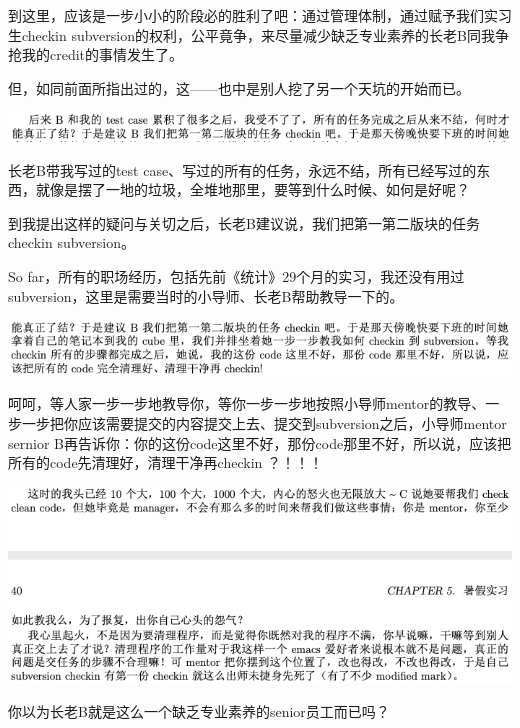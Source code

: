 \documentclass[9pt, b5paper]{article}
\begin{document}
到这里，应该是一步小小的阶段必的胜利了吧：通过管理体制，通过赋予我们实习生checkin subversion的权利，公平竟争，来尽量减少缺乏专业素养的长老B同我争抢我的credit的事情发生了。

但，如同前面所指出过的，这——也中是别人挖了另一个天坑的开始而已。

\begin{center}
\includegraphics[width=.9\linewidth]{./pic/backups_plans_20210505_100918.png}
\end{center}

长老B带我写过的test case、写过的所有的任务，永远不结，所有已经写过的东西，就像是摆了一地的垃圾，全堆地那里，要等到什么时候、如何是好呢？

到我提出这样的疑问与关切之后，长老B建议说，我们把第一第二版块的任务checkin subversion。

So far，所有的职场经历，包括先前《统计》29个月的实习，我还没有用过subversion，这里是需要当时的小导师、长老B帮助教导一下的。 

\begin{center}
\includegraphics[width=.9\linewidth]{./pic/backups_plans_20210505_135942.png}
\end{center}

呵呵，等人家一步一步地教导你，等你一步一步地按照小导师mentor的教导、一步一步把你应该需要提交的内容提交上去、提交到subversion之后，小导师mentor sernior B再告诉你：你的这份code这里不好，那份code那里不好，所以说，应该把所有的code先清理好，清理干净再checkin ？！！！

\begin{center}
\includegraphics[width=.9\linewidth]{./pic/backups_plans_20210505_140038.png}
\end{center}

你以为长老B就是这么一个缺乏专业素养的senior员工而已吗？
\end{document}
